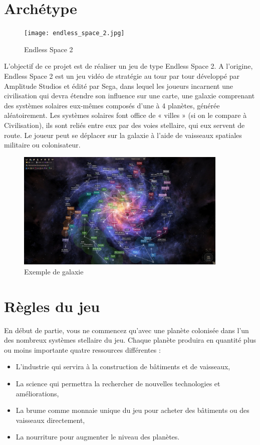 
\section{Archétype}

\begin{figure}[htbp]
\centering
\texttt{[image: endless\_space\_2.jpg]}
\caption[Endless Space 2]{\label{figure_simple}Endless Space 2}
\end{figure}

L’objectif de ce projet est de réaliser un jeu de type Endless Space 2. A l’origine, Endless Space 2 est un jeu vidéo de stratégie au tour par tour développé par Amplitude Studios et édité par Sega, dans lequel les joueurs incarnent une civilisation qui devra étendre son influence sur une carte, une galaxie comprenant des systèmes solaires eux-mêmes composés d’une à 4 planètes, générée aléatoirement. Les systèmes solaires font office de « villes » (si on le compare à Civilisation), ils sont reliés entre eux par des voies stellaire, qui eux servent de route. Le joueur peut se déplacer sur la galaxie à l'aide de vaisseaux spatiales militaire ou colonisateur.\\
\begin{figure}[htbp]
\centering
\includegraphics[width=0.9\textwidth]{pics/galaxie.jpg}
\caption[Exemple de galaxie]{\label{figure_simple}Exemple de galaxie}
\end{figure}
\section{Règles du jeu}

En début de partie, vous ne commencez qu’avec une planète colonisée dans l’un des nombreux systèmes stellaire du jeu. Chaque planète produira en quantité plus ou moins importante quatre ressources différentes :\\
\begin{itemize}
\item L’industrie qui servira à la construction de bâtiments et de vaisseaux,
\item La science qui permettra la rechercher de nouvelles technologies et améliorations,
\item La brume comme monnaie unique du jeu pour acheter des bâtiments ou des vaisseaux directement,
\item La nourriture pour augmenter le niveau des planètes.
\end{itemize} 

